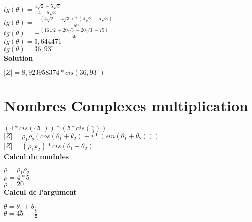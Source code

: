 $tg(\theta) = \frac{4\sqrt{2} - 5\sqrt{3}} {4 - 5\sqrt{3} }$ \\

$tg(\theta) = - \frac{(4\sqrt{2} - 5\sqrt{3}) * (4\sqrt{2} - 5\sqrt{3})}{59}$ \\

$tg(\theta) = - \frac{(16\sqrt{2} + 20\sqrt{6} - 20\sqrt{3} - 75)} {59}$ \\

$tg(\theta) = 0,644471$ \\

$tg(\theta) = 36,93^{\circ}$ \\


\vspace{6mm}
\textbf{Solution}
\vspace{5mm}

$|Z| = 8,923958374*cis(36,93^{\circ})$ \\

\newpage
\section{Nombres Complexes multiplication}
\vspace{3mm} %

$(4 * cis(45^{\circ} )) * (5 * cis(\frac{\pi}{3}))$ \\

$|Z| = \rho_{1}\rho_{2}( cos(\theta_{1} + \theta_{2}) + i*(sin(\theta_{1} + \theta_{2})) )$ \\

$|Z| = (\rho_{1}\rho_{2})*cis(\theta_{1} + \theta_{2})$ \\


\vspace{6mm}
\textbf{Calcul du modules}
\vspace{5mm}

$\rho = \rho_{1}\rho_{2}$ \\

$\rho = 4*5 $ \\

$\rho = 20 $ \\

\vspace{6mm}
\textbf{Calcul de l'argument}
\vspace{5mm}

$\theta = \theta_{1}+\theta_{2}$ \\

$\theta = 45^{\circ} + \frac{\pi}{3}$ \\

